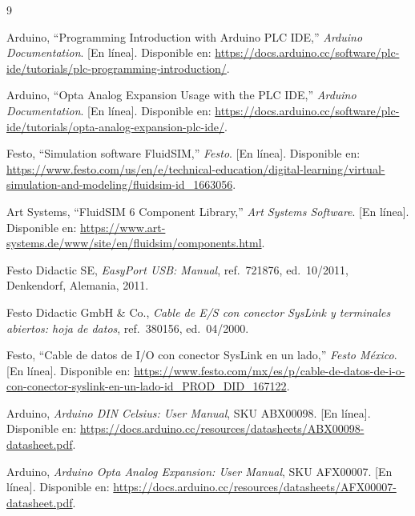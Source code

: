 \documentclass[12pt,a4paper]{article}
\begin{document}
\begin{thebibliography}{9}

Arduino, ``Programming Introduction with Arduino PLC IDE,'' \emph{Arduino
Documentation}. [En línea]. Disponible en:
\url{https://docs.arduino.cc/software/plc-ide/tutorials/plc-programming-introduction/}.

Arduino, ``Opta Analog Expansion Usage with the PLC IDE,'' \emph{Arduino
Documentation}. [En línea]. Disponible en:
\url{https://docs.arduino.cc/software/plc-ide/tutorials/opta-analog-expansion-plc-ide/}.

Festo, ``Simulation software FluidSIM,'' \emph{Festo}. [En línea]. Disponible en:
\url{https://www.festo.com/us/en/e/technical-education/digital-learning/virtual-simulation-and-modeling/fluidsim-id_1663056}.

Art Systems, ``FluidSIM 6 Component Library,'' \emph{Art Systems Software}.
[En línea]. Disponible en:
\url{https://www.art-systems.de/www/site/en/fluidsim/components.html}.

Festo Didactic SE, \emph{EasyPort USB: Manual}, ref.\ 721876, ed.\ 10/2011,
Denkendorf, Alemania, 2011.

Festo Didactic GmbH \& Co., \emph{Cable de E/S con conector SysLink y
terminales abiertos: hoja de datos}, ref.\ 380156, ed.\ 04/2000.

Festo, ``Cable de datos de I/O con conector SysLink en un lado,'' \emph{Festo
México}. [En línea]. Disponible en:
\url{https://www.festo.com/mx/es/p/cable-de-datos-de-i-o-con-conector-syslink-en-un-lado-id_PROD_DID_167122}.

Arduino, \emph{Arduino DIN Celsius: User Manual}, SKU ABX00098. [En
línea]. Disponible en:
\url{https://docs.arduino.cc/resources/datasheets/ABX00098-datasheet.pdf}.

Arduino, \emph{Arduino Opta Analog Expansion: User Manual}, SKU
AFX00007. [En línea]. Disponible en:
\url{https://docs.arduino.cc/resources/datasheets/AFX00007-datasheet.pdf}.

\end{thebibliography}
\end{document}
